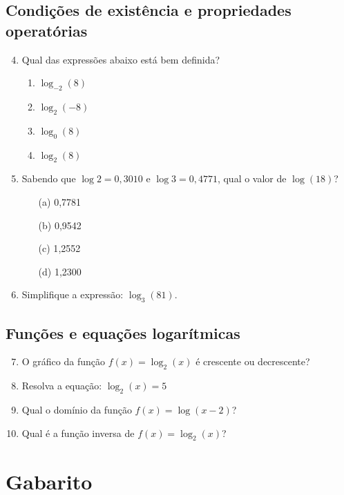 \documentclass[12pt,a4paper]{article}
\begin{document}
\subsection*{Condições de existência e propriedades operatórias}
\begin{enumerate}
  \setcounter{enumi}{3}
  \item Qual das expressões abaixo está bem definida?
        \begin{enumerate}
          \item $\log_{-2}(8)$
          \item $\log_{2}(-8)$
          \item $\log_{0}(8)$
          \item $\log_{2}(8)$
        \end{enumerate}

  \item Sabendo que $\log 2 = 0{,}3010$ e $\log 3 = 0{,}4771$, qual o valor de $\log(18)$?
        \begin{enumerate}
          \item[(a)] 0{,}7781
          \item[(b)] 0{,}9542
          \item[(c)] 1{,}2552
          \item[(d)] 1{,}2300
        \end{enumerate}

  \item Simplifique a expressão: $\log_3(81)$.
\end{enumerate}

\subsection*{Funções e equações logarítmicas}
\begin{enumerate}
  \setcounter{enumi}{6}
  \item O gráfico da função $f(x) = \log_2(x)$ é crescente ou decrescente?

  \item Resolva a equação: $\log_2(x) = 5$

  \item Qual o domínio da função $f(x) = \log(x - 2)$?

  \item Qual é a função inversa de $f(x) = \log_2(x)$?
\end{enumerate}

\newpage

\section*{Gabarito}
\end{document}
